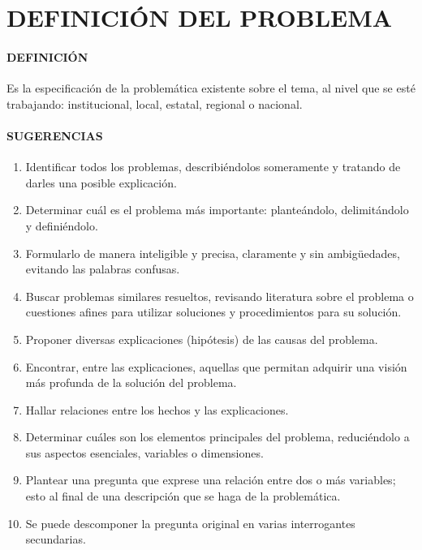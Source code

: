 \section{DEFINICIÓN DEL PROBLEMA}

\paragraph{DEFINICIÓN}
Es la especificación de la problemática existente sobre el tema, al nivel que se esté trabajando: institucional, local, estatal, regional o nacional.

\paragraph{SUGERENCIAS}

\begin{enumerate}
 \item Identificar todos los problemas, describiéndolos someramente y tratando de darles una posible explicación.
 \item Determinar cuál es el problema más importante: planteándolo, delimitándolo y definiéndolo.
 \item Formularlo de manera inteligible y precisa, claramente y sin ambigüedades, evitando las palabras confusas.
 \item Buscar problemas similares resueltos, revisando literatura sobre el problema o cuestiones afines para utilizar soluciones y procedimientos para su solución.
 \item Proponer diversas explicaciones (hipótesis) de las causas del problema.
 \item Encontrar, entre las explicaciones, aquellas que permitan adquirir una visión más profunda de la solución del problema.
 \item Hallar relaciones entre los hechos y las explicaciones.
 \item Determinar cuáles son los elementos principales del problema, reduciéndolo a sus aspectos esenciales, variables o dimensiones.
 \item Plantear una pregunta que exprese una relación entre dos o más variables; esto al final de una descripción que se haga de la problemática.
 \item Se puede descomponer la pregunta original en varias interrogantes secundarias.
\end{enumerate}
